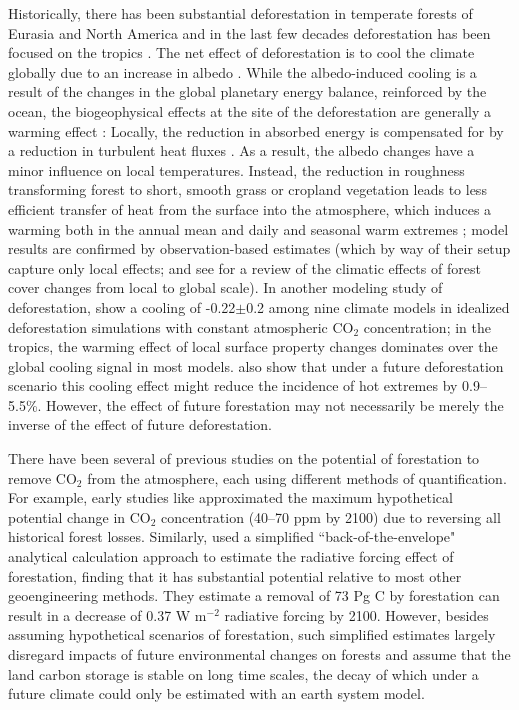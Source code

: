 \documentclass[draft]{agujournal2019}
\begin{document}
Historically, there has been substantial deforestation in temperate forests of Eurasia and North America and in the last few decades deforestation has been focused on the tropics \cite{goldewijk_estimating_2001}.
The net effect of deforestation is to cool the climate globally due to an increase in albedo \cite{davin_climatic_2010}.
While the albedo-induced cooling is a result of the changes in the global planetary energy balance, reinforced by the ocean, the biogeophysical effects at the site of the deforestation are generally a warming effect \cite{winckler_nonlocal_2019}: Locally, the reduction in absorbed energy is compensated for by a reduction in turbulent heat fluxes \cite{winckler_importance_2019}.
As a result, the albedo changes have a minor influence on local temperatures.
Instead, the reduction in roughness transforming forest to short, smooth grass or cropland vegetation leads to less efficient transfer of heat from the surface into the atmosphere, which induces a warming both in the annual mean and daily and seasonal warm extremes \cite{winckler_different_2019}; model results are confirmed by observation-based estimates (which by way of their setup capture only local effects;   and see  for a review of the climatic effects of forest cover changes from local to global scale).
In another modeling study of deforestation,  show a cooling of -0.22$\pm$0.2 \textcelsius{} among nine climate models in idealized deforestation simulations with constant atmospheric CO$_2$ concentration; in the tropics, the warming effect of local surface property changes dominates over the global cooling signal in most models.
 also show that under a future deforestation scenario this cooling effect might reduce the incidence of hot extremes by 0.9--5.5\%.
However, the effect of future forestation may not necessarily be merely the inverse of the effect of future deforestation.

There have been several of previous studies on the potential of forestation to remove CO$_2$ from the atmosphere, each using different methods of quantification.
For example, early studies like  approximated the maximum hypothetical potential change in CO$_2$ concentration (40--70 ppm by 2100) due to reversing all historical forest losses. Similarly,  used a simplified ``back-of-the-envelope" analytical calculation approach to estimate the radiative forcing effect of forestation, finding that it has substantial potential relative to most other geoengineering methods.
They estimate a removal of 73 Pg C by forestation can result in a decrease of 0.37 W m$^{-2}$ radiative forcing by 2100.
However, besides assuming hypothetical scenarios of forestation, such simplified estimates largely disregard impacts of future environmental changes on forests and assume that the land carbon storage is stable on long time scales, the decay of which under a future climate could only be estimated with an earth system model.
\end{document}
